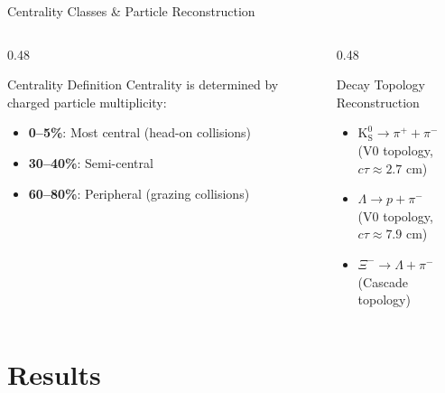 \documentclass[10pt, aspectratio=169]{beamer}
\begin{document}
\begin{frame}{Centrality Classes \& Particle Reconstruction}

  \begin{columns}
    \begin{column}{0.48\textwidth}
      \begin{block}{Centrality Definition}
        Centrality is determined by charged particle multiplicity:
        \begin{itemize}
          \item \textbf{0--5\%}: Most central (head-on collisions)
          \item \textbf{30--40\%}: Semi-central
          \item \textbf{60--80\%}: Peripheral (grazing collisions)
        \end{itemize}
      \end{block}
    \end{column}
    \begin{column}{0.48\textwidth}
      \begin{block}{Decay Topology Reconstruction}
        \begin{itemize}
          \item $\mathrm{K^0_S} \rightarrow \pi^+ + \pi^-$ \\ \small (V0 topology, $c\tau \approx 2.7$ cm)
          \vspace{0.2cm}
          \item $\Lambda \rightarrow p + \pi^-$ \\ \small (V0 topology, $c\tau \approx 7.9$ cm)
          \vspace{0.2cm}
          \item $\Xi^- \rightarrow \Lambda + \pi^-$ \\ \small (Cascade topology)
        \end{itemize}
      \end{block}
    \end{column}
  \end{columns}

\end{frame}

\section{Results}
\end{document}
